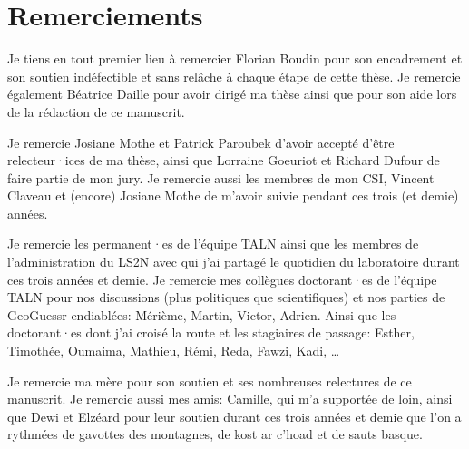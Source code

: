 \vspace{5cm}

\chapter*{Remerciements}

\hspace{2cm}

\begin{adjustwidth}{1.5cm}{1.5cm}
Je tiens en tout premier lieu à remercier Florian Boudin pour son encadrement et son soutien indéfectible et sans relâche à chaque étape de cette thèse. Je remercie également Béatrice Daille pour avoir dirigé ma thèse ainsi que pour son aide lors de la rédaction de ce manuscrit.

Je remercie Josiane Mothe et Patrick Paroubek d'avoir accepté d'être relecteur·ices de ma thèse, ainsi que Lorraine Goeuriot et Richard Dufour de  faire partie de mon jury. Je remercie aussi les membres de mon CSI, Vincent Claveau et (encore) Josiane Mothe de m'avoir suivie pendant ces trois (et demie) années.

Je remercie les permanent·es de l'équipe TALN ainsi que les membres de l'administration du LS2N avec qui j'ai partagé le quotidien du laboratoire durant ces trois années et demie.
Je remercie mes collègues doctorant·es de l'équipe TALN pour nos discussions (plus politiques que scientifiques) et nos parties de GeoGuessr endiablées: Mérième, Martin, Victor, Adrien. Ainsi que les doctorant·es dont j'ai croisé la route et les stagiaires de passage: Esther, Timothée, Oumaima, Mathieu, Rémi, Reda, Fawzi, Kadi, \ldots

Je remercie ma mère pour son soutien et ses nombreuses relectures de ce manuscrit. Je remercie aussi mes amis: Camille, qui m'a supportée de loin, ainsi que Dewi et Elzéard pour leur soutien durant ces trois années et demie que l'on a rythmées de gavottes des montagnes, de kost ar c'hoad et de sauts basque.
\end{adjustwidth}